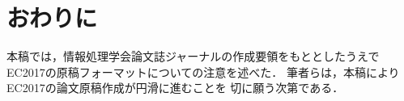 \section{おわりに}

本稿では，情報処理学会論文誌ジャーナルの作成要領をもととしたうえで
EC2017の原稿フォーマットについての注意を述べた．
筆者らは，本稿によりEC2017の論文原稿作成が円滑に進むことを
切に願う次第である．
